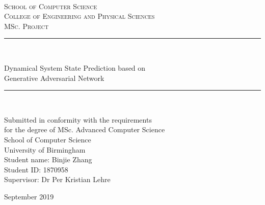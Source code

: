 \documentclass[11pt,a4paper]{article}
\newcommand{\bhamstudentname}{Binjie Zhang}
\newcommand{\bhamfronttitle}{Dynamical System State Prediction based on\\ Generative Adversarial Network}
\newcommand{\bhamschool}{School of Computer Science}
\newcommand{\bhamcollege}{Engineering and Physical Sciences}
\newcommand{\bhamdegree}{MSc. Advanced Computer Science}
\newcommand{\bhamid}{1870958}
\newcommand{\bhamsupervisor}{Dr Per Kristian Lehre}
\newcommand{\bhamyear}{2019}
\newcommand{\HRule}{\rule{\linewidth}{0.5mm}}
\begin{document}
\thispagestyle{empty}
\begin{titlepage}
\begin{center}
\begin{minipage}{6in}
  \centering
  \hspace*{.2in}
  \end{minipage}
  \\ [1.0cm]
\textsc{{\LARGE \bhamschool\\}College of \bhamcollege}\\[3.5cm] 

\textsc{\Large MSc. Project}\\[0.5cm]

\HRule \\[0.4cm]
\begin{center}\Huge
\bhamfronttitle
\end{center}
\HRule \\[1.5cm]

\begin{center}
Submitted in conformity with the requirements\\ for the degree of \bhamdegree\\
\bhamschool\\ University of Birmingham\\
\vspace{2cm}
Student name: \bhamstudentname\\
Student ID: \bhamid\\
Supervisor: \bhamsupervisor      
\end{center}
\vfill

{\large September \bhamyear}

\end{center}
\end{titlepage}
\end{document}
